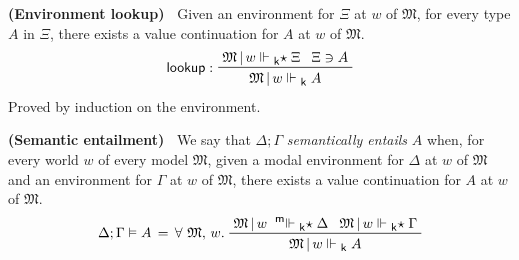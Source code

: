 \documentclass{entcs}
\numberwithin{equation}{thm}
\newcommand{\tsf}[1]{\textsf{\upshape{#1}}}
\newcommand{\stsf}[1]{\tsf{\small{#1}}}
\renewcommand{\:}{\mathrel{:}}
\newcommand{\tyrule}[1]{\prftree[l]{${#1} \:\,$}}
\let\oldforall\forall
\renewcommand{\forall}{\oldforall\,}
\newcommand{\0}{\varnothing}
\newcommand{\M}{\mathfrak{M}}
\newcommand{\eek}{\mathrel{\Vdash_{\stsf{k}}}}
\newcommand{\eeks}{\mathrel{\Vdash_{\stsf{k}}\mkern-5mu\star}}
\newcommand{\meeks}{\mathrel{^{\stsf{m}\mkern-6mu}\Vdash_{\stsf{k}}\mkern-5mu\star}}
\newcommand{\eeq}{\mathrel{\vDash}}
\newcommand{\lookup}{\operatorname{\tsf{lookup}}}
\begin{document}
\begin{lemma}
  \normalshape
  \textbf{(Environment lookup)\ }
  \label{lookup}
  Given an environment for $\Xi$ at $w$ of $\M$, for every type $A$ in $\Xi$, there exists a value continuation for $A$ at $w$ of $\M$.
  \begin{gather*}
    \tyrule{\lookup}{\M\,|\,w \eeks \Xi}{\Xi \ni A}{\M\,|\,w \eek A}
  \end{gather*}
  Proved by induction on the environment.
\end{lemma}

\begin{definition}
  \textbf{(Semantic entailment)\ }
  \label{eeq}
  We say that $\Delta; \Gamma$ \emph{semantically entails} $A$ when, for every world $w$ of every model $\M$, given a modal environment for $\Delta$ at $w$ of $\M$ and an environment for $\Gamma$ at $w$ of $\M$, there exists a value continuation for $A$ at $w$ of $\M$.
  \begin{gather*}
    \Delta; \Gamma \eeq A \,=\, \forall \M,\,w.\ \raisebox{-8pt}{$\prftree{\M\,|\,w \meeks \Delta}{\M\,|\,w \eeks \Gamma}{\M\,|\,w \eek A}$}
  \end{gather*}
\end{definition}
\end{document}
